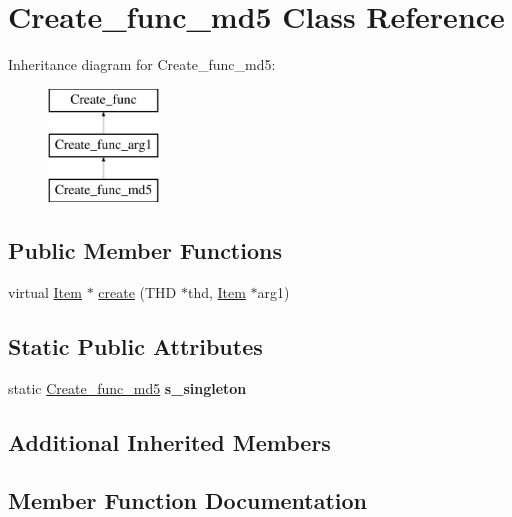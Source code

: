 \hypertarget{classCreate__func__md5}{}\section{Create\+\_\+func\+\_\+md5 Class Reference}
\label{classCreate__func__md5}
Inheritance diagram for Create\+\_\+func\+\_\+md5\+:\begin{figure}[H]
\begin{center}
\leavevmode
\includegraphics[height=3.000000cm]{classCreate__func__md5}
\end{center}
\end{figure}
\subsection*{Public Member Functions}
\begin{DoxyCompactItemize}
\item 
virtual \mbox{\hyperlink{classItem}{Item}} $\ast$ \mbox{\hyperlink{classCreate__func__md5_aeea562afe7440464dae7e0c8947a958a}{create}} (T\+HD $\ast$thd, \mbox{\hyperlink{classItem}{Item}} $\ast$arg1)
\end{DoxyCompactItemize}
\subsection*{Static Public Attributes}
\begin{DoxyCompactItemize}
\item 
\mbox{\label{classCreate__func__md5_a13353d0174154a4aaec8a95eeebedf5d}} 
static \mbox{\hyperlink{classCreate__func__md5}{Create\+\_\+func\+\_\+md5}} {\bfseries s\+\_\+singleton}
\end{DoxyCompactItemize}
\subsection*{Additional Inherited Members}


\subsection{Member Function Documentation}
\mbox{\label{classCreate__func__md5_aeea562afe7440464dae7e0c8947a958a}} 
